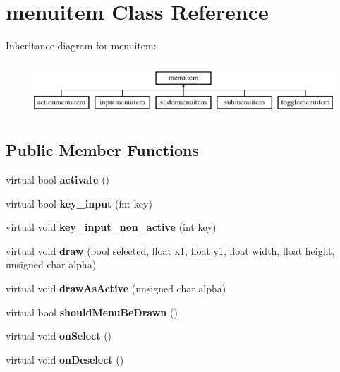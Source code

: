 \hypertarget{classmenuitem}{\section{menuitem Class Reference}
\label{classmenuitem}
}
Inheritance diagram for menuitem\-:\begin{figure}[H]
\begin{center}
\leavevmode
\includegraphics[height=2.000000cm]{classmenuitem}
\end{center}
\end{figure}
\subsection*{Public Member Functions}
\begin{DoxyCompactItemize}
\item 
\hypertarget{classmenuitem_a1cd433f71ec87a82e02bc105d4bcde13}{virtual bool {\bfseries activate} ()}\label{classmenuitem_a1cd433f71ec87a82e02bc105d4bcde13}

\item 
\hypertarget{classmenuitem_a67852d94fa74d5b75cfff6fbd0f113cb}{virtual bool {\bfseries key\-\_\-input} (int key)}\label{classmenuitem_a67852d94fa74d5b75cfff6fbd0f113cb}

\item 
\hypertarget{classmenuitem_a85a5989ec80f92cd77c6f91b4e57a1e7}{virtual void {\bfseries key\-\_\-input\-\_\-non\-\_\-active} (int key)}\label{classmenuitem_a85a5989ec80f92cd77c6f91b4e57a1e7}

\item 
\hypertarget{classmenuitem_a1398cc7e99754db2824bcd0a310901d2}{virtual void {\bfseries draw} (bool selected, float x1, float y1, float width, float height, unsigned char alpha)}\label{classmenuitem_a1398cc7e99754db2824bcd0a310901d2}

\item 
\hypertarget{classmenuitem_aeb0cc4c1f6632df5e3e70e53d68b5641}{virtual void {\bfseries draw\-As\-Active} (unsigned char alpha)}\label{classmenuitem_aeb0cc4c1f6632df5e3e70e53d68b5641}

\item 
\hypertarget{classmenuitem_ae6d98769321752ff844e5e566f614098}{virtual bool {\bfseries should\-Menu\-Be\-Drawn} ()}\label{classmenuitem_ae6d98769321752ff844e5e566f614098}

\item 
\hypertarget{classmenuitem_a247b8c4cc76430523f69f5c1b47c0c91}{virtual void {\bfseries on\-Select} ()}\label{classmenuitem_a247b8c4cc76430523f69f5c1b47c0c91}

\item 
\hypertarget{classmenuitem_ae59b15770dbdcfad2f96ca9e610e2726}{virtual void {\bfseries on\-Deselect} ()}\label{classmenuitem_ae59b15770dbdcfad2f96ca9e610e2726}

\end{DoxyCompactItemize}
